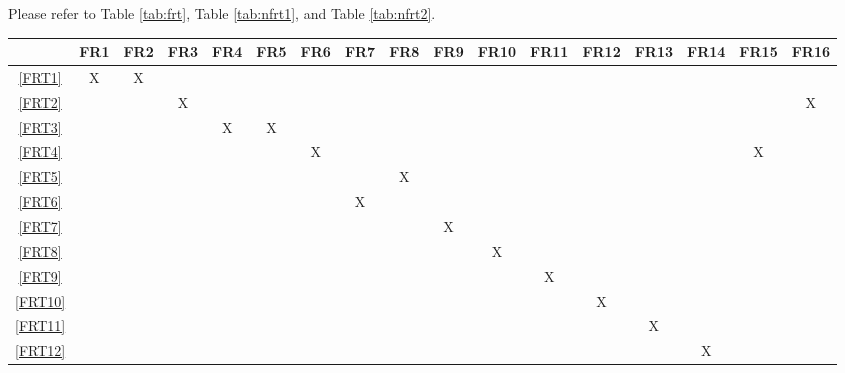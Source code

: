 \documentclass[12pt, titlepage]{article}
\begin{document}
\setlength{\tabcolsep}{2pt}
\begin{landscape}
  Please refer to Table \ref{tab:frt}, Table \ref{tab:nfrt1}, and Table \ref{tab:nfrt2}.
  \begin{table}[h!]
    \centering
    \begin{tabular}{|c|c|c|c|c|c|c|c|c|c|c|c|c|c|c|c|c|} \hline
               & FR1 & FR2 & FR3 & FR4 & FR5 & FR6 & FR7 & FR8 & FR9 & FR10 & FR11 & FR12 & FR13 & FR14 & FR15 & FR16 \\ \hline
      \ref{FRT1}  & X   & X   &     &     &     &     &     &     &     &      &      &      &      &      &      &      \\ \hline
      \ref{FRT2}  &     &     & X   &     &     &     &     &     &     &      &      &      &      &      &      & X    \\ \hline
      \ref{FRT3}  &     &     &     & X   & X   &     &     &     &     &      &      &      &      &      &      &      \\ \hline
      \ref{FRT4}  &     &     &     &     &     & X   &     &     &     &      &      &      &      &      & X    &      \\ \hline
      \ref{FRT5}  &     &     &     &     &     &     &     & X   &     &      &      &      &      &      &      &      \\ \hline
      \ref{FRT6}  &     &     &     &     &     &     & X   &     &     &      &      &      &      &      &      &      \\ \hline
      \ref{FRT7}  &     &     &     &     &     &     &     &     & X   &      &      &      &      &      &      &      \\ \hline
      \ref{FRT8}  &     &     &     &     &     &     &     &     &     & X    &      &      &      &      &      &      \\ \hline
      \ref{FRT9}  &     &     &     &     &     &     &     &     &     &      & X    &      &      &      &      &      \\ \hline
      \ref{FRT10} &     &     &     &     &     &     &     &     &     &      &      & X    &      &      &      &      \\ \hline
      \ref{FRT11} &     &     &     &     &     &     &     &     &     &      &      &      & X    &      &      &      \\ \hline
      \ref{FRT12} &     &     &     &     &     &     &     &     &     &      &      &      &      & X    &      &      \\ \hline
    \end{tabular}

\end{table}
\end{landscape}
\end{document}
